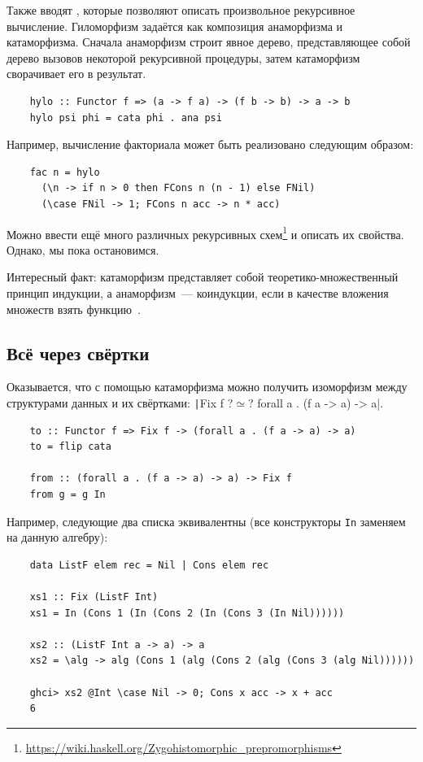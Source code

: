 Также вводят , которые позволяют описать произвольное рекурсивное вычисление.
Гиломорфизм задаётся как композиция анаморфизма и катаморфизма.
Сначала анаморфизм строит явное дерево, представляющее собой дерево вызовов некоторой рекурсивной процедуры, затем катаморфизм сворачивает его в результат.
\begin{verbatim}
    hylo :: Functor f => (a -> f a) -> (f b -> b) -> a -> b
    hylo psi phi = cata phi . ana psi
\end{verbatim}

Например, вычисление факториала может быть реализовано следующим образом:
\begin{verbatim}
    fac n = hylo
      (\n -> if n > 0 then FCons n (n - 1) else FNil)
      (\case FNil -> 1; FCons n acc -> n * acc)
\end{verbatim}

Можно ввести ещё много различных рекурсивных схем\footnote{\url{https://wiki.haskell.org/Zygohistomorphic_prepromorphisms}} и описать их свойства.
Однако, мы пока остановимся.

Интересный факт: катаморфизм представляет собой теоретико-множественный принцип индукции, а анаморфизм~--- коиндукции, если в качестве вложения множеств взять функцию~\cite[глава 21]{pierce2002types}.

\subsection{Всё через свёртки} \label{subsec:all-folds}

Оказывается, что с помощью катаморфизма можно получить изоморфизм между структурами данных и их свёртками:
\texttt|Fix f ?$\simeq$? forall a . (f a -> a) -> a|.
\begin{verbatim}
    to :: Functor f => Fix f -> (forall a . (f a -> a) -> a)
    to = flip cata

    from :: (forall a . (f a -> a) -> a) -> Fix f
    from g = g In
\end{verbatim}

Например, следующие два списка эквивалентны (все конструкторы \texttt{In} заменяем на данную алгебру):
\begin{verbatim}
    data ListF elem rec = Nil | Cons elem rec

    xs1 :: Fix (ListF Int)
    xs1 = In (Cons 1 (In (Cons 2 (In (Cons 3 (In Nil))))))

    xs2 :: (ListF Int a -> a) -> a
    xs2 = \alg -> alg (Cons 1 (alg (Cons 2 (alg (Cons 3 (alg Nil))))))

    ghci> xs2 @Int \case Nil -> 0; Cons x acc -> x + acc
    6
\end{verbatim}

